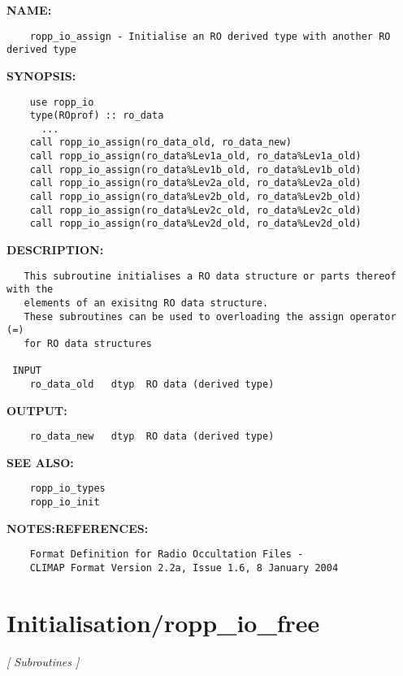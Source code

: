 \label{ch:robo67}
\label{ch:Initialisation_ropp_io_assign}
\textbf{NAME:}\hspace{0.08in}\begin{Verbatim}
    ropp_io_assign - Initialise an RO derived type with another RO derived type
\end{Verbatim}
\textbf{SYNOPSIS:}\hspace{0.08in}\begin{Verbatim}
    use ropp_io
    type(ROprof) :: ro_data
      ...
    call ropp_io_assign(ro_data_old, ro_data_new) 
    call ropp_io_assign(ro_data%Lev1a_old, ro_data%Lev1a_old)
    call ropp_io_assign(ro_data%Lev1b_old, ro_data%Lev1b_old)
    call ropp_io_assign(ro_data%Lev2a_old, ro_data%Lev2a_old)
    call ropp_io_assign(ro_data%Lev2b_old, ro_data%Lev2b_old)
    call ropp_io_assign(ro_data%Lev2c_old, ro_data%Lev2c_old)
    call ropp_io_assign(ro_data%Lev2d_old, ro_data%Lev2d_old)
\end{Verbatim}
\textbf{DESCRIPTION:}\hspace{0.08in}\begin{Verbatim}
   This subroutine initialises a RO data structure or parts thereof with the 
   elements of an exisitng RO data structure.
   These subroutines can be used to overloading the assign operator (=)
   for RO data structures

 INPUT
    ro_data_old   dtyp  RO data (derived type)
\end{Verbatim}
\textbf{OUTPUT:}\hspace{0.08in}\begin{Verbatim}
    ro_data_new   dtyp  RO data (derived type)
\end{Verbatim}
\textbf{SEE ALSO:}\hspace{0.08in}\begin{Verbatim}
    ropp_io_types
    ropp_io_init
\end{Verbatim}
\textbf{NOTES:}\hspace{0.08in}\textbf{REFERENCES:}\hspace{0.08in}\begin{Verbatim}
    Format Definition for Radio Occultation Files -
    CLIMAP Format Version 2.2a, Issue 1.6, 8 January 2004
\end{Verbatim}
\section{Initialisation/ropp\_io\_free}
\textsl{[ Subroutines ]}

